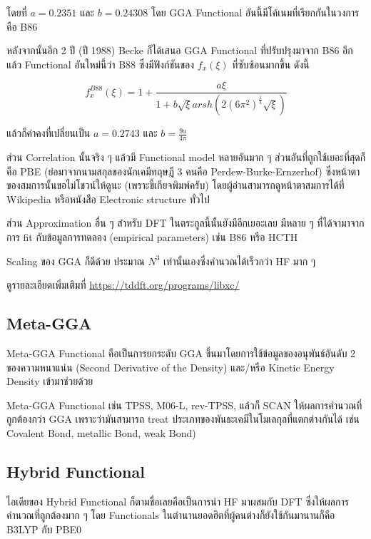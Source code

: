 \noindent โดยที่ $a = 0.2351$ และ $b = 0.24308$ โดย GGA Functional อันนี้มีโค้เนมที่เรียกกันในวงการคือ B86

หลังจากนั้นอีก 2 ปี (ปี 1988) Becke ก็ได้เสนอ GGA Functional ที่ปรับปรุงมาจาก B86 อีกแล้ว Functional
อันใหม่นี้ว่า B88 ซึ่งมีฟังก์ชันของ $f_{x}(\xi)$ ที่ซับซ้อนมากขึ้น ดังนี้ 

\begin{equation}
    f^{B88}_{x}(\xi) = 
    1 + \frac{a\xi}{1 + b\sqrt{\xi} arsh (2(6\pi^{2})^{\frac{1}{3}} \sqrt{\xi })}
\end{equation}

\noindent แล้วก็ค่าคงที่เปลี่ยนเป็น $a = 0.2743$ และ $b = \frac{9a}{4\pi}$

ส่วน Correlation นั้นจริง ๆ แล้วมี Functional model หลายอันมาก ๆ ส่วนอันที่ถูกใช้เยอะที่สุดก็คือ PBE 
(ย่อมาจากนามสกุลของนักเคมีทฤษฎี 3 คนคือ Perdew-Burke-Ernzerhof) ซึ่งหน้าตาของสมการนั้นขอไม่โชวน์ให้ดูนะ
(เพราะขี้เกียจพิมพ์ครับ) โดยผู้อ่านสามารถดูหน้าตาสมการได้ที่ Wikipedia หรือหนังสือ Electronic structure ทั่วไป 

ส่วน Approximation อื่น ๆ สำหรับ DFT ในตระกูลนี้นั้นยังมีอีกเยอะเลย มีหลาย ๆ ที่ได้จามาจากการ fit กับข้อมูลการทดลอง 
(empirical parameters) เช่น B86 หรือ HCTH 

Scaling ของ GGA ก็ดีด้วย ประมาณ $N^{3}$ เท่านั้นเองซึ่งคำนวณได้เร็วกว่า HF มาก ๆ

ดูรายละเอียดเพิ่มเติมที่ \url{https://tddft.org/programs/libxc/}

\subsection{Meta-GGA}

Meta-GGA Functional คือเป็นการยกระดับ GGA ขึ้นมาโดยการใช้ข้อมูลของอนุพันธ์อันดับ 2 ของความหนาแน่น (Second 
Derivative of the Density) และ/หรือ Kinetic Energy Density เข้ามาช่วยด้วย 

Meta-GGA Functional เช่น TPSS, M06-L, rev-TPSS, แล้วก็ SCAN ให้ผลการคำนวณที่ถูกต้องกว่า GGA 
เพราะว่ามันสามารถ treat ประเภทของพันธะเคมีในโมเลกุลที่แตกต่างกันได้ เช่น Covalent Bond, metallic Bond, 
weak Bond) 

\subsection{Hybrid Functional}

ไอเดียของ Hybrid Functional ก็ตามชื่อเลยคือเป็นการนำ HF มาผสมกับ DFT ซึ่งให้ผลการคำนวณที่ถูกต้องมาก ๆ 
โดย Functionals ในตำนานยอดฮิตที่ผู้คนต่างก็ยังใช้กันมานานก็คือ B3LYP กับ PBE0 

